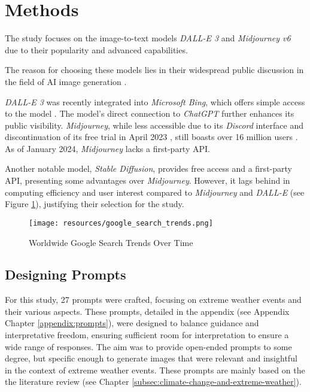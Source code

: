 \section{Methods}

The study focuses on the image-to-text models \textit{DALL-E 3} and \textit{Midjourney v6} due to their popularity and advanced capabilities.

The reason for choosing these models lies in their widespread public discussion in the field of AI image generation \parencite{Gibson2023, Gindham2023, Guiness2023}.

\textit{DALL-E 3} was recently integrated into \textit{Microsoft Bing}, which offers simple access to the model \parencite{Bing2024}. The model's direct connection to \textit{ChatGPT} further enhances its public visibility. \textit{Midjourney}, while less accessible due to its \textit{Discord} interface and discontinuation of its free trial in April 2023 \parencite{Weiss2023}, still boasts over 16 million users \parencite{Krivec2023}. As of January 2024, \textit{Midjourney} lacks a first-party API.

Another notable model, \textit{Stable Diffusion}, provides free access and a first-party API, presenting some advantages over \textit{Midjourney}. However, it lags behind in computing efficiency \parencite{Kothari2023} and user interest compared to \textit{Midjourney} and \textit{DALL-E} (see Figure \ref{fig:google_search_trends}), justifying their selection for the study.

\begin{figure}[h]
    \centering
    \texttt{[image: resources/google\_search\_trends.png]}
    \caption[Text-to-Image Models Google Search Trends]{Worldwide Google Search Trends Over Time}
    \label{fig:google_search_trends}
\end{figure}

\subsection{Designing Prompts}
\label{subsec:designing-prompts}

For this study, 27 prompts were crafted, focusing on extreme weather events and their various aspects. These prompts, detailed in the appendix (see Appendix Chapter \ref{appendix:prompts}), were designed to balance guidance and interpretative freedom, ensuring sufficient room for interpretation to ensure a wide range of responses. The aim was to provide open-ended prompts to some degree, but specific enough to generate images that were relevant and insightful in the context of extreme weather events. These prompts are mainly based on the the literature review (see Chapter \ref{subsec:climate-change-and-extreme-weather}).

